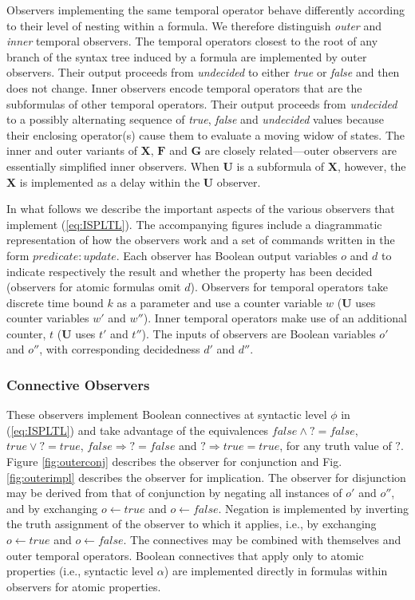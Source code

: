 \documentclass{llncs}
\begin{document}
Observers implementing the same temporal operator behave differently
according to their level of nesting within a formula. We therefore
distinguish \emph{outer} and \emph{inner} temporal observers. The
temporal operators closest to the root of any branch of the syntax
tree induced by a formula are implemented by outer observers. Their
output proceeds from \emph{undecided} to either \emph{true} or \emph{false}
and then does not change. Inner observers encode temporal operators
that are the subformulas of other temporal operators. Their output
proceeds from \emph{undecided} to a possibly alternating sequence
of \emph{true}, \emph{false} and \emph{undecided} values because their
enclosing operator(s) cause them to evaluate a moving widow of states.
The inner and outer variants of $\mathbf{X}$, $\mathbf{F}$ and $\mathbf{G}$
are closely related---outer observers are essentially simplified inner
observers. When $\mathbf{U}$ is a subformula of $\mathbf{X}$, however,
the $\mathbf{X}$ is implemented as a delay within the $\mathbf{U}$
observer.

In what follows we describe the important aspects of the various observers
that implement (\ref{eq:ISPLTL}). The accompanying figures include
a diagrammatic representation of how the observers work and a set
of commands written in the form $\mathit{predicate}:\mathit{update}$.
Each observer has Boolean output variables $o$ and $d$ to indicate
respectively the result and whether the property has been decided
(observers for atomic formulas omit $d$). Observers for temporal
operators take discrete time bound $k$ as a parameter and use a counter
variable $w$ ($\mathbf{U}$ uses counter variables $w'$ and $w''$).
Inner temporal operators make use of an additional counter, $t$ ($\mathbf{U}$
uses $t'$ and $t''$). The inputs of observers are Boolean variables
$o'$ and $o''$, with corresponding decidedness $d'$ and $d''$.


\subsubsection*{Connective Observers}

These observers implement Boolean connectives at syntactic level $\phi$
in (\ref{eq:ISPLTL}) and take advantage of the equivalences $\mathit{false}\wedge\textsf{?}=\mathit{false}$,
$\mathit{true}\vee\textsf{?}=\mathit{true}$, $\mathit{false}\Rightarrow\textsf{?}=\mathit{false}$
and $\textsf{?}\Rightarrow\mathit{true}=\mathit{true}$, for any truth
value of $\textsf{?}$. Figure \ref{fig:outerconj} describes the
observer for conjunction and Fig. \ref{fig:outerimpl} describes the
observer for implication. The observer for disjunction may be derived
from that of conjunction by negating all instances of $o'$ and $o''$,
and by exchanging $o\leftarrow\mathit{true}$ and $o\leftarrow\mathit{false}$.
Negation is implemented by inverting the truth assignment of the observer
to which it applies, i.e., by exchanging $o\leftarrow\mathit{true}$
and $o\leftarrow\mathit{false}$. The connectives may be combined
with themselves and outer temporal operators. Boolean connectives
that apply only to atomic properties (i.e., syntactic level $\alpha$)
are implemented directly in formulas within observers for atomic properties.
\end{document}
